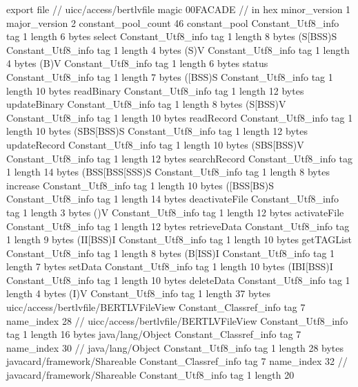 export file {		// uicc/access/bertlvfile
	magic	00FACADE		 // in hex
	minor_version	1
	major_version	2
	constant_pool_count	46
	constant_pool {
		Constant_Utf8_info {
			tag	1
			length	6
			bytes	select
		}
		Constant_Utf8_info {
			tag	1
			length	8
			bytes	(S[BSS)S
		}
		Constant_Utf8_info {
			tag	1
			length	4
			bytes	(S)V
		}
		Constant_Utf8_info {
			tag	1
			length	4
			bytes	(B)V
		}
		Constant_Utf8_info {
			tag	1
			length	6
			bytes	status
		}
		Constant_Utf8_info {
			tag	1
			length	7
			bytes	([BSS)S
		}
		Constant_Utf8_info {
			tag	1
			length	10
			bytes	readBinary
		}
		Constant_Utf8_info {
			tag	1
			length	12
			bytes	updateBinary
		}
		Constant_Utf8_info {
			tag	1
			length	8
			bytes	(S[BSS)V
		}
		Constant_Utf8_info {
			tag	1
			length	10
			bytes	readRecord
		}
		Constant_Utf8_info {
			tag	1
			length	10
			bytes	(SBS[BSS)S
		}
		Constant_Utf8_info {
			tag	1
			length	12
			bytes	updateRecord
		}
		Constant_Utf8_info {
			tag	1
			length	10
			bytes	(SBS[BSS)V
		}
		Constant_Utf8_info {
			tag	1
			length	12
			bytes	searchRecord
		}
		Constant_Utf8_info {
			tag	1
			length	14
			bytes	(BSS[BSS[SSS)S
		}
		Constant_Utf8_info {
			tag	1
			length	8
			bytes	increase
		}
		Constant_Utf8_info {
			tag	1
			length	10
			bytes	([BSS[BS)S
		}
		Constant_Utf8_info {
			tag	1
			length	14
			bytes	deactivateFile
		}
		Constant_Utf8_info {
			tag	1
			length	3
			bytes	()V
		}
		Constant_Utf8_info {
			tag	1
			length	12
			bytes	activateFile
		}
		Constant_Utf8_info {
			tag	1
			length	12
			bytes	retrieveData
		}
		Constant_Utf8_info {
			tag	1
			length	9
			bytes	(II[BSS)I
		}
		Constant_Utf8_info {
			tag	1
			length	10
			bytes	getTAGList
		}
		Constant_Utf8_info {
			tag	1
			length	8
			bytes	(B[ISS)I
		}
		Constant_Utf8_info {
			tag	1
			length	7
			bytes	setData
		}
		Constant_Utf8_info {
			tag	1
			length	10
			bytes	(IBI[BSS)I
		}
		Constant_Utf8_info {
			tag	1
			length	10
			bytes	deleteData
		}
		Constant_Utf8_info {
			tag	1
			length	4
			bytes	(I)V
		}
		Constant_Utf8_info {
			tag	1
			length	37
			bytes	uicc/access/bertlvfile/BERTLVFileView
		}
		Constant_Classref_info {
			tag	7
			name_index	28		// uicc/access/bertlvfile/BERTLVFileView
		}
		Constant_Utf8_info {
			tag	1
			length	16
			bytes	java/lang/Object
		}
		Constant_Classref_info {
			tag	7
			name_index	30		// java/lang/Object
		}
		Constant_Utf8_info {
			tag	1
			length	28
			bytes	javacard/framework/Shareable
		}
		Constant_Classref_info {
			tag	7
			name_index	32		// javacard/framework/Shareable
		}
		Constant_Utf8_info {
			tag	1
			length	20
}}}
